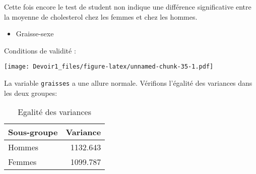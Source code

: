 \documentclass[]{article}
\newenvironment{Shaded}{\begin{snugshade}}{\end{snugshade}}
\newcommand{\KeywordTok}[1]{\textcolor[rgb]{0.13,0.29,0.53}{\textbf{#1}}}
\newcommand{\DataTypeTok}[1]{\textcolor[rgb]{0.13,0.29,0.53}{#1}}
\newcommand{\DecValTok}[1]{\textcolor[rgb]{0.00,0.00,0.81}{#1}}
\newcommand{\StringTok}[1]{\textcolor[rgb]{0.31,0.60,0.02}{#1}}
\newcommand{\ControlFlowTok}[1]{\textcolor[rgb]{0.13,0.29,0.53}{\textbf{#1}}}
\newcommand{\OperatorTok}[1]{\textcolor[rgb]{0.81,0.36,0.00}{\textbf{#1}}}
\newcommand{\NormalTok}[1]{#1}
\providecommand{\tightlist}{%
  \setlength{\itemsep}{0pt}\setlength{\parskip}{0pt}}
\begin{document}
Cette fois encore le test de student non indique une différence
significative entre la moyenne de cholesterol chez les femmes et chez
les hommes.

\begin{itemize}
\tightlist
\item
  Graisse-sexe
\end{itemize}

Conditions de validité :

\begin{Shaded}
\end{Shaded}

\texttt{[image: Devoir1\_files/figure-latex/unnamed-chunk-35-1.pdf]}

La variable \texttt{graisses} a une allure normale. Vérifions l'égalité
des variances dans les deux groupes:

\begin{Shaded}
\end{Shaded}

\begin{table}

\caption{\label{tab:unnamed-chunk-36}Egalité des variances}
\centering
\begin{tabular}[t]{l|r}
\hline
Sous-groupe & Variance\\
\hline
Hommes & 1132.643\\
\hline
Femmes & 1099.787\\
\hline
\end{tabular}
\end{table}
\end{document}
